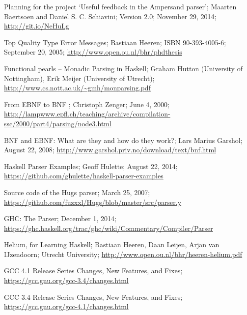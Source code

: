 \label{sec:bibliography}

\begin{thebibliography}{99}
\setlength\columnsep{35pt}
\begin{multicols}{2}
\small

	Planning for the project `Useful feedback in the Ampersand parser';
	Maarten Baertsoen and Daniel S. C. Schiavini;
	Version 2.0;
	November 29, 2014;
	\url{http://git.io/NeHuLg}

	Top Quality Type Error Messages;
	Bastiaan Heeren;
	ISBN 90-393-4005-6;
	September 20, 2005;
	\url{http://www.open.ou.nl/bhr/phdthesis}

	Functional pearls -- Monadic Parsing in Haskell;
	Graham Hutton (University of Nottingham), Erik Meijer (University of Utrecht);
	\url{http://www.cs.nott.ac.uk/~gmh/monparsing.pdf}

	 From EBNF to BNF ;
	 Christoph Zenger;
	 June 4, 2000;
	 \url{http://lampwww.epfl.ch/teaching/archive/compilation-ssc/2000/part4/parsing/node3.html}

	BNF and EBNF: What are they and how do they work?;
	Lars Marius Garshol;
	August 22, 2008;
	\url{http://www.garshol.priv.no/download/text/bnf.html}

	Haskell Parser Examples;
	Geoff Hulette;
	August 22, 2014;
	\url{https://github.com/ghulette/haskell-parser-examples}

	Source code of the Hugs parser;
	March 25, 2007;
	\url{https://github.com/fuzxxl/Hugs/blob/master/src/parser.y}

	GHC: The Parser;
	December 1, 2014;
	\url{https://ghc.haskell.org/trac/ghc/wiki/Commentary/Compiler/Parser}

	Helium, for Learning Haskell;
	Bastiaan Heeren, Daan Leijen, Arjan van IJzendoorn;
	Utrecht University;
	\url{http://www.open.ou.nl/bhr/heeren-helium.pdf}
	
	GCC 4.1 Release Series Changes, New Features, and Fixes;
	\url{https://gcc.gnu.org/gcc-3.4/changes.html}

	GCC 3.4 Release Series Changes, New Features, and Fixes;
	\url{https://gcc.gnu.org/gcc-4.1/changes.html}
	

\end{multicols}
\end{thebibliography}
